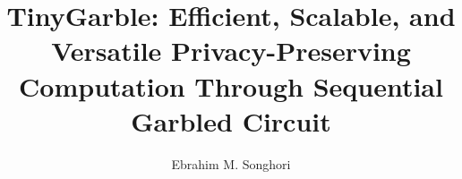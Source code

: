 \documentclass[12pt]{ruthesis}
\title{TinyGarble: Efficient, Scalable, and Versatile Privacy-Preserving Computation Through Sequential Garbled Circuit}
\author{Ebrahim M. Songhori}
\begin{document}
  \begin{frontmatter}
   \maketitle
   
   \tableofcontents
   \listoffigures
   \listoftables
%   
  \end{frontmatter}











\appendices




\end{document}
